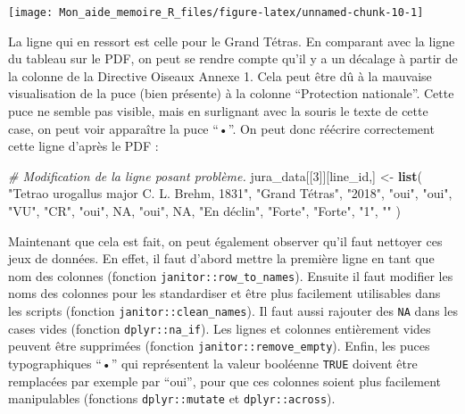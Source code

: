 \documentclass[
  french,
]{book}
\newenvironment{Shaded}{\begin{snugshade}}{\end{snugshade}}
\newcommand{\CommentTok}[1]{\textcolor[rgb]{0.56,0.35,0.01}{\textit{#1}}}
\newcommand{\DecValTok}[1]{\textcolor[rgb]{0.00,0.00,0.81}{#1}}
\newcommand{\KeywordTok}[1]{\textcolor[rgb]{0.13,0.29,0.53}{\textbf{#1}}}
\newcommand{\NormalTok}[1]{#1}
\newcommand{\OtherTok}[1]{\textcolor[rgb]{0.56,0.35,0.01}{#1}}
\newcommand{\StringTok}[1]{\textcolor[rgb]{0.31,0.60,0.02}{#1}}
\begin{document}
\begin{center}\texttt{[image: Mon\_aide\_memoire\_R\_files/figure-latex/unnamed-chunk-10-1]} \end{center}

La ligne qui en ressort est celle pour le Grand Tétras. En comparant avec la
ligne du tableau sur le PDF, on peut se rendre compte qu'il y a un décalage à
partir de la colonne de la Directive Oiseaux Annexe 1. Cela peut être dû à la
mauvaise visualisation de la puce (bien présente) à la colonne
``Protection nationale''. Cette puce ne semble pas visible, mais en surlignant
avec la souris le texte de cette case, on peut voir apparaître la puce ``•''. On
peut donc réécrire correctement cette ligne d'après le PDF :

\begin{Shaded}
\begin{Highlighting}[]
\CommentTok{\# Modification de la ligne posant problème.}
\NormalTok{jura\_data[[}\DecValTok{3}\NormalTok{]][line\_id,] \textless{}{-}}\StringTok{ }\KeywordTok{list}\NormalTok{(}
  \StringTok{"Tetrao urogallus major C. L. Brehm, 1831"}\NormalTok{,}
  \StringTok{"Grand Tétras"}\NormalTok{,}
  \StringTok{"2018"}\NormalTok{,}
  \StringTok{"oui"}\NormalTok{,}
  \StringTok{"oui"}\NormalTok{,}
  \StringTok{"VU"}\NormalTok{,}
  \StringTok{"CR"}\NormalTok{,}
  \StringTok{"oui"}\NormalTok{,}
  \OtherTok{NA}\NormalTok{,}
  \StringTok{"oui"}\NormalTok{,}
  \OtherTok{NA}\NormalTok{,}
  \StringTok{"En déclin"}\NormalTok{,}
  \StringTok{"Forte"}\NormalTok{,}
  \StringTok{"Forte"}\NormalTok{,}
  \StringTok{"1"}\NormalTok{,}
  \StringTok{""}
\NormalTok{)}
\end{Highlighting}
\end{Shaded}

Maintenant que cela est fait, on peut également observer qu'il faut nettoyer ces
jeux de données. En effet, il faut d'abord mettre la première ligne en tant que
nom des colonnes (fonction \texttt{janitor::row\_to\_names}). Ensuite il faut modifier
les noms des colonnes pour les standardiser et être plus facilement utilisables
dans les scripts (fonction \texttt{janitor::clean\_names}). Il faut aussi rajouter des
\texttt{NA} dans les cases vides (fonction \texttt{dplyr::na\_if}). Les lignes et colonnes
entièrement vides peuvent être supprimées (fonction \texttt{janitor::remove\_empty}).
Enfin, les puces typographiques ``•'' qui représentent la valeur booléenne \texttt{TRUE}
doivent être remplacées par exemple par ``oui'', pour que ces colonnes soient plus
facilement manipulables (fonctions \texttt{dplyr::mutate} et \texttt{dplyr::across}).
\end{document}
